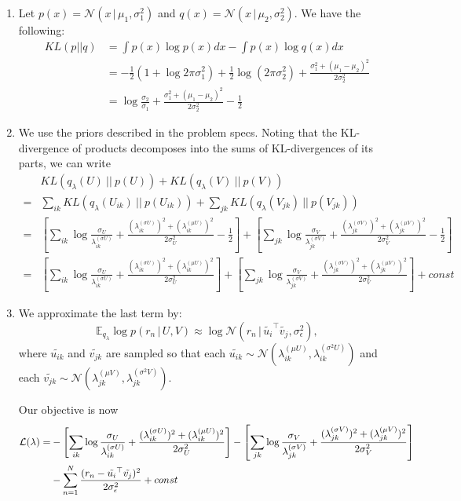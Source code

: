 \documentclass[submit]{harvardml}
\newcommand{\given}{\,|\,}
\newcommand{\N}{\mathcal{N}}
\theoremstyle{plain}
\begin{document}
\begin{enumerate}
	\item Let $p(x) = \N(x\given \mu_1, \sigma_1^2)$ and $q(x) = \N(x\given \mu_2, \sigma_2^2)$. We have the following:
	\begin{align*}
	KL(p||q) 
	&= \int p(x) \log p(x) dx - \int p(x) \log q(x) dx \\
	&= - \frac{1}{2} (1 + \log 2 \pi \sigma_1^2) + \frac{1}{2} \log (2 \pi \sigma_2^2) + \frac{\sigma_1^2 + (\mu_1 - \mu_2)^2}{2 \sigma_2^2} \\
	&= \log \frac{\sigma_2}{\sigma_1} + \frac{\sigma_1^2 + (\mu_1 - \mu_2)^2}{2 \sigma_2^2} - \frac{1}{2}
	\end{align*}
	
	\item We use the priors described in the problem specs. Noting that the KL-divergence of products decomposes into the sums of KL-divergences of its parts, we can write
	\begin{align*}
	& KL(q_\lambda(U)\ ||\  p(U) ) + KL(q_\lambda(V)\ ||\ p(V)) \\
	=& \sum_{ik} KL(q_\lambda(U_{ik})\ ||\  p(U_{ik})) + \sum_{jk} KL(q_\lambda(V_{jk})\ ||\  p(V_{jk})) \\
	=& 
	\left[\sum_{ik} \log \frac{\sigma_{U}}{\lambda^{(\sigma U)}_{ik}} + \frac{(\lambda^{(\sigma U)}_{ik})^2 + (\lambda^{(\mu U)}_{ik})^2}{2 \sigma_{U}^2} - \frac{1}{2}\right]
	+ \left[\sum_{jk} \log \frac{\sigma_{V}}{\lambda^{(\sigma V)}_{jk}} + \frac{(\lambda^{(\sigma V)}_{jk})^2 + (\lambda^{(\mu V)}_{jk})^2}{2 \sigma_{V}^2} - \frac{1}{2}\right]
	\\
	=& 
	\left[\sum_{ik} \log \frac{\sigma_{U}}{\lambda^{(\sigma U)}_{ik}} + \frac{(\lambda^{(\sigma U)}_{ik})^2 + (\lambda^{(\mu U)}_{ik})^2}{2 \sigma_{U}^2}\right]
	+ \left[\sum_{jk} \log \frac{\sigma_{V}}{\lambda^{(\sigma V)}_{jk}} + \frac{(\lambda^{(\sigma V)}_{jk})^2 + (\lambda^{(\mu V)}_{jk})^2}{2 \sigma_{V}^2}\right] + const
	\end{align*}
	
	\item We approximate the last term by:
	\[
	\mathbb{E}_{q_\lambda} \log p(r_n\given U, V) 
	\approx \log \N(r_n\given \tilde{u_i}^\top \tilde{v_j}, \sigma_\epsilon^2),
	\]
	where $\tilde{u_{ik}}$ and $\tilde{v_{jk}}$ are sampled so that each $\tilde{u_{ik}} \sim \N(\lambda^{(\mu U)}_{ik}, \lambda^{(\sigma^2 U)}_{ik})$ and each $\tilde{v_{jk}} \sim \N(\lambda^{(\mu V)}_{jk}, \lambda^{(\sigma^2 V)}_{jk})$. 
	
	Our objective is now
	\begin{align*}
	{\cal L}(\lambda) =&
	-\left[\sum_{ik} \log \frac{\sigma_{U}}{\lambda^{(\sigma U)}_{ik}} + \frac{(\lambda^{(\sigma U)}_{ik})^2 + (\lambda^{(\mu U)}_{ik})^2}{2 \sigma_{U}^2}\right]
	- \left[\sum_{jk} \log \frac{\sigma_{V}}{\lambda^{(\sigma V)}_{jk}} + \frac{(\lambda^{(\sigma V)}_{jk})^2 + (\lambda^{(\mu V)}_{jk})^2}{2 \sigma_{V}^2}\right] \\
	&- \sum_{n=1}^N \frac{(r_n - \tilde{u_i}^\top \tilde{v_j})^2}{2\sigma_\epsilon^2}
	+ const
	\end{align*}
	

\end{enumerate}
\end{document}
